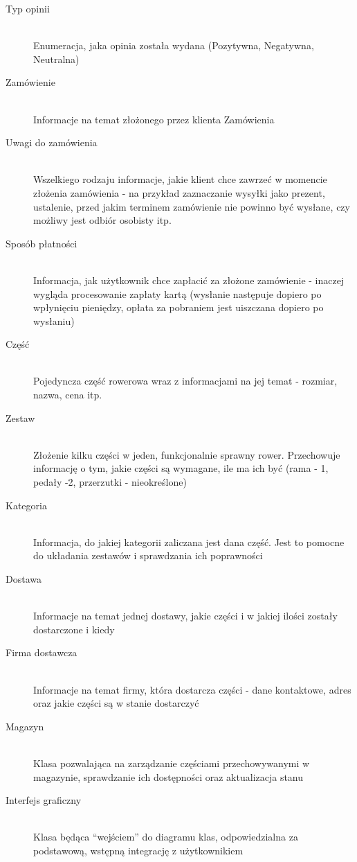 \begin{description}
	\item[Typ opinii] \hfill \\
		Enumeracja, jaka opinia została wydana (Pozytywna, Negatywna, Neutralna)
	\item[Zamówienie] \hfill \\
		Informacje na temat złożonego przez klienta Zamówienia
	\item[Uwagi do zamówienia] \hfill \\
		Wszelkiego rodzaju informacje, jakie klient chce zawrzeć w momencie złożenia
		zamówienia - na przykład zaznaczanie wysyłki jako prezent, ustalenie, przed
		jakim terminem zamówienie nie powinno być wysłane, czy możliwy jest odbiór
		osobisty itp.
	\item[Sposób płatności] \hfill \\
		Informacja, jak użytkownik chce zapłacić za złożone zamówienie - inaczej
		wygląda procesowanie zapłaty kartą (wysłanie następuje dopiero po wpłynięciu
		pieniędzy, opłata za pobraniem jest uiszczana dopiero po wysłaniu)
	\item[Część] \hfill \\
		Pojedyncza część rowerowa wraz z informacjami na jej temat - rozmiar, nazwa,
		cena itp.
	\item[Zestaw] \hfill \\
		Złożenie kilku części w jeden, funkcjonalnie sprawny rower. Przechowuje
		informację o tym, jakie części są wymagane, ile ma ich być (rama - 1, pedały
		-2, przerzutki - nieokreślone)
	\item[Kategoria] \hfill \\
		Informacja, do jakiej kategorii zaliczana jest dana część. Jest to pomocne do
		układania zestawów i sprawdzania ich poprawności
	\item[Dostawa] \hfill \\
		Informacje na temat jednej dostawy, jakie części i w jakiej ilości zostały
		dostarczone i kiedy
	\item[Firma dostawcza] \hfill \\
		Informacje na temat firmy, która dostarcza części - dane kontaktowe, adres
		oraz jakie części są w stanie dostarczyć
	\item[Magazyn] \hfill \\
		Klasa pozwalająca na zarządzanie częściami przechowywanymi w magazynie,
		sprawdzanie ich dostępności oraz aktualizacja stanu
	\item[Interfejs graficzny] \hfill \\
		Klasa będąca ``wejściem'' do diagramu klas, odpowiedzialna za podstawową,
		wstępną integrację z użytkownikiem
\end{description}